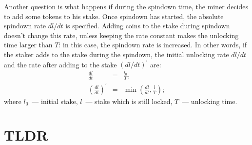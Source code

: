 \documentclass[longbibliography,nofootinbib,twocolumn]{revtex4-1}
\begin{document}
Another question is what happens if during the spindown time, the miner decides to add some tokens to his stake.
Once spindown has started, the absolute spindown rate $dl/dt$ is specified.
Adding coins to the stake during spindown doesn't change this rate, unless keeping the rate constant makes the unlocking time larger than $T$:
in this case, the spindown rate is increased.
In other words, if the staker adds to the stake during the spindown, the initial unlocking rate $dl/dt$ and the rate after adding to the stake
$(dl/dt)^{\prime}$ are:
\begin{eqnarray}
    \frac{dl}{dt} &=& \frac{l_0}{T},\\
    \left(\frac{dl}{dt}\right)^{\prime} &=& \min\left( \frac{dl}{dt}, \frac{l}{T}\right);
\end{eqnarray}
where $l_0$~--- initial stake, $l$~--- stake which is still locked, $T$~--- unlocking time.

\section{TLDR}


\end{document}

